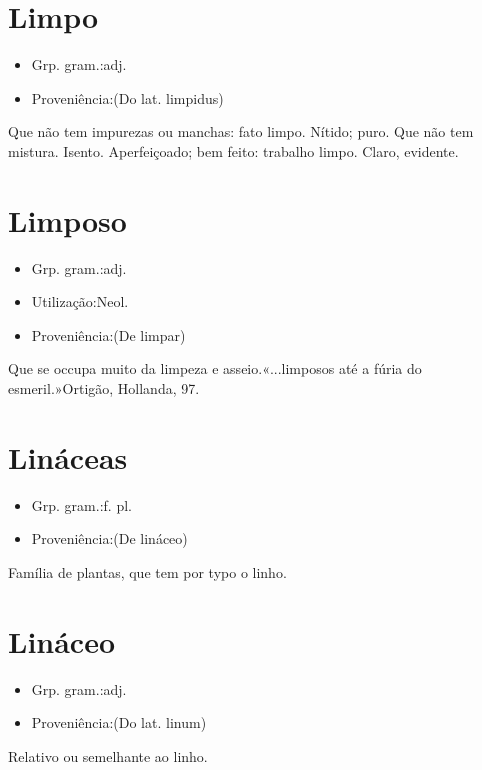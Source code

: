 \section{Limpo}
\begin{itemize}
\item {Grp. gram.:adj.}
\end{itemize}
\begin{itemize}
\item {Proveniência:(Do lat. \textunderscore limpidus\textunderscore )}
\end{itemize}
Que não tem impurezas ou manchas: \textunderscore fato limpo\textunderscore .
Nítido; puro.
Que não tem mistura.
Isento.
Aperfeiçoado; bem feito: \textunderscore trabalho limpo\textunderscore .
Claro, evidente.
\section{Limposo}
\begin{itemize}
\item {Grp. gram.:adj.}
\end{itemize}
\begin{itemize}
\item {Utilização:Neol.}
\end{itemize}
\begin{itemize}
\item {Proveniência:(De \textunderscore limpar\textunderscore )}
\end{itemize}
Que se occupa muito da limpeza e asseio.«\textunderscore ...limposos até a fúria do esmeril.\textunderscore »Ortigão, \textunderscore Hollanda\textunderscore , 97.
\section{Lináceas}
\begin{itemize}
\item {Grp. gram.:f. pl.}
\end{itemize}
\begin{itemize}
\item {Proveniência:(De \textunderscore lináceo\textunderscore )}
\end{itemize}
Família de plantas, que tem por typo o linho.
\section{Lináceo}
\begin{itemize}
\item {Grp. gram.:adj.}
\end{itemize}
\begin{itemize}
\item {Proveniência:(Do lat. \textunderscore linum\textunderscore )}
\end{itemize}
Relativo ou semelhante ao linho.
